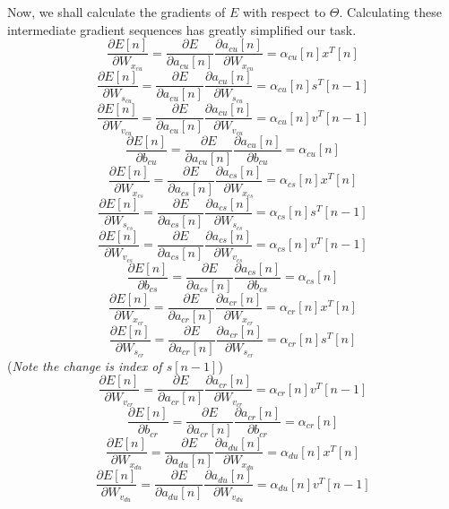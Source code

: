 \documentclass[12pt,a4paper]{article}
\begin{document}
{Now, we shall calculate the gradients of $E$ with respect to $\Theta$. 
Calculating these intermediate gradient sequences has greatly simplified our task.
\[ 
\frac{\partial{E[n]}}{\partial{W_{x_{cu}}}} = \frac{\partial{E}}{\partial{a_{cu}[n]}}\frac{\partial{a_{cu}[n]}}{\partial{W_{x_{cu}}}} = \alpha_{cu}[n]x^{T}[n] \tag{64}
\]
\[ 
\frac{\partial{E[n]}}{\partial{W_{s_{cu}}}} = \frac{\partial{E}}{\partial{a_{cu}[n]}}\frac{\partial{a_{cu}[n]}}{\partial{W_{s_{cu}}}} = \alpha_{cu}[n]s^{T}[n-1] \tag{65}
\]
\[ 
\frac{\partial{E[n]}}{\partial{W_{v_{cu}}}} = \frac{\partial{E}}{\partial{a_{cu}[n]}}\frac{\partial{a_{cu}[n]}}{\partial{W_{v_{cu}}}} = \alpha_{cu}[n]v^{T}[n-1] \tag{66}
\]
\[ 
\frac{\partial{E[n]}}{\partial{b_{cu}}} = \frac{\partial{E}}{\partial{a_{cu}[n]}}\frac{\partial{a_{cu}[n]}}{\partial{b_{cu}}} = \alpha_{cu}[n] \tag{67}
\]
\[ 
\frac{\partial{E[n]}}{\partial{W_{x_{cs}}}} = \frac{\partial{E}}{\partial{a_{cs}[n]}}\frac{\partial{a_{cs}[n]}}{\partial{W_{x_{cs}}}} = \alpha_{cs}[n]x^{T}[n] \tag{68}
\]
\[ 
\frac{\partial{E[n]}}{\partial{W_{s_{cs}}}} = \frac{\partial{E}}{\partial{a_{cs}[n]}}\frac{\partial{a_{cs}[n]}}{\partial{W_{s_{cs}}}} = \alpha_{cs}[n]s^{T}[n-1] \tag{69}
\]
\[ 
\frac{\partial{E[n]}}{\partial{W_{v_{cs}}}} = \frac{\partial{E}}{\partial{a_{cs}[n]}}\frac{\partial{a_{cs}[n]}}{\partial{W_{v_{cs}}}} = \alpha_{cs}[n]v^{T}[n-1] \tag{70}
\]
\[ 
\frac{\partial{E[n]}}{\partial{b_{cs}}} = \frac{\partial{E}}{\partial{a_{cs}[n]}}\frac{\partial{a_{cs}[n]}}{\partial{b_{cs}}} = \alpha_{cs}[n] \tag{71}
\]
\[ 
\frac{\partial{E[n]}}{\partial{W_{x_{cr}}}} = \frac{\partial{E}}{\partial{a_{cr}[n]}}\frac{\partial{a_{cr}[n]}}{\partial{W_{x_{cr}}}} = \alpha_{cr}[n]x^{T}[n] \tag{72}
\]
\[ 
\frac{\partial{E[n]}}{\partial{W_{s_{cr}}}} = \frac{\partial{E}}{\partial{a_{cr}[n]}}\frac{\partial{a_{cr}[n]}}{\partial{W_{s_{cr}}}} = \alpha_{cr}[n]s^{T}[n] \tag{73}
\]
(\textit{Note the change is index of $s[n-1]$})
\[ 
\frac{\partial{E[n]}}{\partial{W_{v_{cr}}}} = \frac{\partial{E}}{\partial{a_{cr}[n]}}\frac{\partial{a_{cr}[n]}}{\partial{W_{v_{cr}}}} = \alpha_{cr}[n]v^{T}[n-1] \tag{74}
\]
\[ 
\frac{\partial{E[n]}}{\partial{b_{cr}}} = \frac{\partial{E}}{\partial{a_{cr}[n]}}\frac{\partial{a_{cr}[n]}}{\partial{b_{cr}}} = \alpha_{cr}[n] \tag{75}
\]
\[ 
\frac{\partial{E[n]}}{\partial{W_{x_{du}}}} = \frac{\partial{E}}{\partial{a_{du}[n]}}\frac{\partial{a_{du}[n]}}{\partial{W_{x_{du}}}} = \alpha_{du}[n]x^{T}[n] \tag{76}
\]
\[ 
\frac{\partial{E[n]}}{\partial{W_{v_{du}}}} = \frac{\partial{E}}{\partial{a_{du}[n]}}\frac{\partial{a_{du}[n]}}{\partial{W_{v_{du}}}} = \alpha_{du}[n]v^{T}[n-1] \tag{77}
\]}
\end{document}
